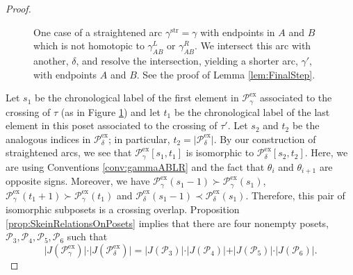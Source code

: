 \documentclass[12pt, letterpaper,table]{amsart}
\theoremstyle{remark}
\newcommand{\calP}{\mathcal{P}}
\newcommand{\stir}{\mathrm{str}}
\newcommand{\exx}{\mathrm{ex}}
\begin{document}
\begin{proof}
\begin{figure}
    \centering
{}
\caption{One case of a straightened arc $\gamma^\stir = \gamma$ with endpoints in $A$ and $B$ which is not homotopic to $\gamma_{AB}^L$ or $\gamma_{AB}^R$. We intersect this arc with another, $\delta$, and resolve the intersection, yielding a shorter arc, $\gamma'$, with endpoints $A$ and $B$. See the proof of Lemma \ref{lem:FinalStep}.}
\label{fig:Case1}
\end{figure}

Let $s_1$ be the chronological label of the first element in $\calP_\gamma^\exx$ associated to the crossing of $\tau$ (as in Figure \ref{fig:Case1}) and let $t_1$ be the chronological label of the last element in this poset associated to the crossing of $\tau'$. Let $s_2$ and $t_2$ be the analogous indices in $\calP_{\delta}^\exx$; in particular, $t_2 = \vert \calP_{\delta}^\exx \vert$. By our construction of straightened arcs, we see that $\calP_\gamma^\exx[s_1,t_1]$ is isomorphic to $\calP_{\delta}^\exx[s_2,t_2]$. Here, we are using Conventions \ref{conv:gammaABLR} and the fact that $\theta_i$ and $\theta_{i+1}$ are opposite signs. Moreover, we have $\calP_\gamma^\exx(s_1-1) \succ \calP_\gamma^\exx(s_1)$, $\calP_\gamma^\exx(t_1+1) \succ \calP_\gamma^\exx(t_1)$ and $\calP_{\delta}^\exx(s_1-1) \prec \calP_{\delta}^\exx(s_1)$. Therefore, this pair of isomorphic subposets is a crossing overlap. Proposition \ref{prop:SkeinRelationsOnPosets} implies that there are four nonempty posets, $\calP_3,\calP_4,\calP_5,\calP_6$ such that \[
\vert J(\calP_\gamma^\exx) \vert \cdot \vert J(\calP_{\delta}^\exx)\vert = \vert J(\calP_3) \vert \cdot \vert  J(\calP_4)\vert +  \vert J(\calP_5) \vert \cdot \vert  J(\calP_6)\vert.
\]


\end{proof}
\end{document}
